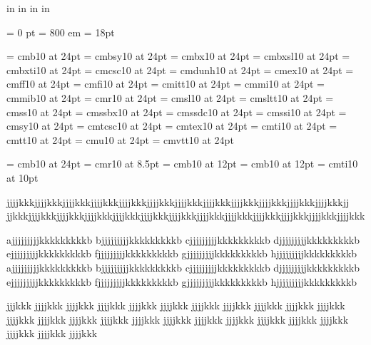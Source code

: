 \nopagenumbers

 in     %
 in    %
 in  %
 in  %

\parindent = 0 pt
\emergencystretch = 800 em
\baselineskip = 18pt


\font\FFcmb=      cmb10            at 24pt
\font\FFcmbsy=    cmbsy10          at 24pt
\font\FFcmbx=     cmbx10           at 24pt
\font\FFcmbxsl=   cmbxsl10         at 24pt
\font\FFcmbxti=   cmbxti10         at 24pt
\font\FFcmcsc=    cmcsc10          at 24pt
\font\FFcmdunh=   cmdunh10         at 24pt
\font\FFcmex=     cmex10           at 24pt
\font\FFcmff=     cmff10           at 24pt
\font\FFcmfi=     cmfi10           at 24pt
\font\FFcmitt=    cmitt10          at 24pt
\font\FFcmmi=     cmmi10           at 24pt
\font\FFcmmib=    cmmib10          at 24pt
\font\FFcmr=      cmr10            at 24pt
\font\FFcmsl=     cmsl10           at 24pt
\font\FFcmsltt=   cmsltt10         at 24pt
\font\FFcmss=     cmss10           at 24pt
\font\FFcmssbx=   cmssbx10         at 24pt
\font\FFcmssdc=   cmssdc10         at 24pt
\font\FFcmssi=    cmssi10          at 24pt
\font\FFcmsy=     cmsy10           at 24pt
\font\FFcmtcsc=   cmtcsc10         at 24pt
\font\FFcmtex=    cmtex10          at 24pt
\font\FFcmti=     cmti10           at 24pt
\font\FFcmtt=     cmtt10           at 24pt
\font\FFcmu=      cmu10            at 24pt
\font\FFcmvtt=    cmvtt10          at 24pt

\font\FFaa=      cmb10            at 24pt
\font\FFbb=      cmr10            at 8.5pt
\font\FFcc=      cmb10            at 12pt
\font\FFdd=      cmb10            at 12pt
\font\FFee=      cmti10           at 10pt


jjjjkkkjjjjkkkjjjjkkkjjjjkkkjjjjkkkjjjjkkkjjjjkkkjjjjkkkjjjjkkkjjjjkkkjjjjkkkjjjjkkkjj
jjkkkjjjjkkkjjjjkkkjjjjkkkjjjjkkkjjjjkkkjjjjkkkjjjjkkkjjjjkkkjjjjkkkjjjjkkkjjjjkkkjjjjkkk

ajjjjjjjjjkkkkkkkkkb
bjjjjjjjjjkkkkkkkkkb
cjjjjjjjjjkkkkkkkkkb
djjjjjjjjjkkkkkkkkkb
ejjjjjjjjjkkkkkkkkkb
fjjjjjjjjjkkkkkkkkkb
gjjjjjjjjjkkkkkkkkkb
hjjjjjjjjjkkkkkkkkkb
ajjjjjjjjjkkkkkkkkkb
bjjjjjjjjjkkkkkkkkkb
cjjjjjjjjjkkkkkkkkkb
djjjjjjjjjkkkkkkkkkb
ejjjjjjjjjkkkkkkkkkb
fjjjjjjjjjkkkkkkkkkb
gjjjjjjjjjkkkkkkkkkb
hjjjjjjjjjkkkkkkkkkb

jjjkkk jjjjkkk jjjjkkk jjjjkkk jjjjkkk jjjjkkk jjjjkkk jjjjkkk jjjjkkk jjjjkkk jjjjkkk jjjjkkk jjjjkkk jjjjkkk jjjjkkk jjjjkkk jjjjkkk jjjjkkk jjjjkkk jjjjkkk jjjjkkk jjjjkkk jjjjkkk jjjjkkk jjjjkkk

